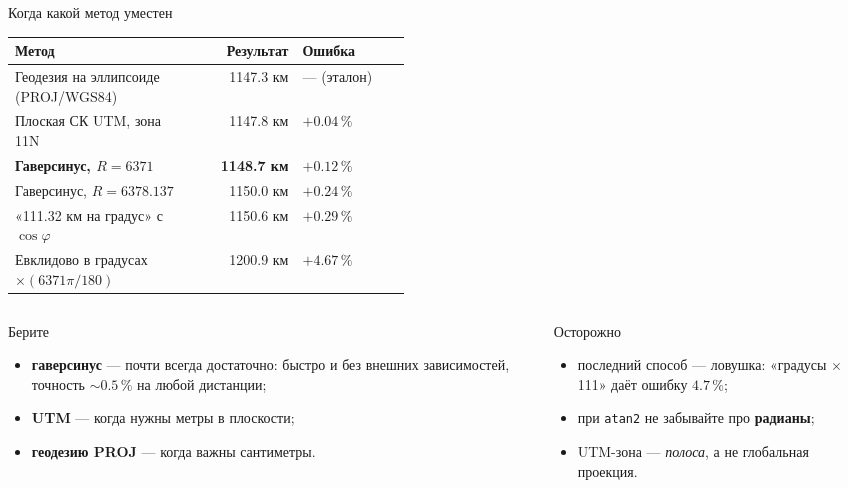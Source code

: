 \documentclass[aspectratio=169,10pt]{beamer}
\begin{document}
\begin{frame}{Когда какой метод уместен}
\footnotesize
{}
\renewcommand{\arraystretch}{0.95}
\begin{tabular}{@{}p{0.46\linewidth}rl@{}}
  \toprule
  Метод & Результат & Ошибка \\
  \midrule
  Геодезия на эллипсоиде (PROJ/WGS84) & 1147.3 км & --- (эталон) \\
  Плоская СК UTM, зона 11N & 1147.8 км & $+0.04\,\%$ \\
  \textbf{Гаверсинус, $R=6371$} & \textbf{1148.7 км} & $+0.12\,\%$ \\
  Гаверсинус, $R=6378.137$ & 1150.0 км & $+0.24\,\%$ \\
  «111.32 км на градус» с $\cos\varphi$ & 1150.6 км & $+0.29\,\%$ \\
  Евклидово в градусах $\times(6371\pi/180)$ & 1200.9 км & $+4.67\,\%$ \\
  \bottomrule
\end{tabular}

\vspace{0.2em}
\begin{columns}[T,onlytextwidth]
  \begin{column}{0.5\textwidth}
    \begin{block}{Берите}\small
      \begin{itemize}\itemsep1pt
        \item \textbf{гаверсинус} --- почти всегда достаточно: быстро
              и без внешних зависимостей, точность $\sim0.5\,\%$
              на любой дистанции;
        \item \textbf{UTM} --- когда нужны метры в плоскости;
        \item \textbf{геодезию PROJ} --- когда важны сантиметры.
      \end{itemize}
    \end{block}
  \end{column}
  \begin{column}{0.48\textwidth}
    \begin{alertblock}{Осторожно}\small
      \begin{itemize}\itemsep1pt
        \item последний способ --- ловушка: «градусы $\times$ 111»
              даёт ошибку $4.7\,\%$;
        \item при \texttt{atan2} не забывайте про \textbf{радианы};
        \item UTM-зона --- \emph{полоса}, а не глобальная проекция.
      \end{itemize}
    \end{alertblock}
  \end{column}
\end{columns}
\end{frame}
\end{document}
